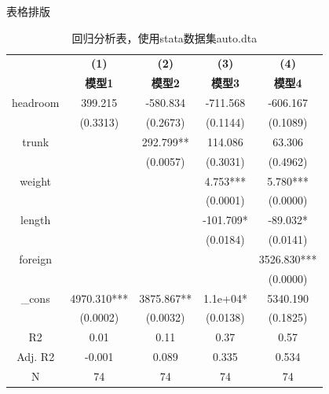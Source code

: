 \documentclass[xcolor=table,mathserif]{beamer}
\begin{document}
\begin{frame}{表格排版}
    \begin{table}[]
        \scriptsize
        \caption{回归分析表，使用stata数据集auto.dta}
        \begin{tabular}{ccccc}
        \hline
                 & \textbf{(1)} & \textbf{(2)} & \textbf{(3)} & \textbf{(4)} \\
                 & \textbf{模型1} & \textbf{模型2} & \textbf{模型3} & \textbf{模型4} \\ \hline
        headroom & 399.215      & -580.834     & -711.568     & -606.167     \\
                 & (0.3313)     & (0.2673)     & (0.1144)     & (0.1089)     \\
        trunk    &              & 292.799**    & 114.086      & 63.306       \\
                 &              & (0.0057)     & (0.3031)     & (0.4962)     \\
        weight   &              &              & 4.753***     & 5.780***     \\
                 &              &              & (0.0001)     & (0.0000)     \\
        length   &              &              & -101.709*    & -89.032*     \\
                 &              &              & (0.0184)     & (0.0141)     \\
        foreign  &              &              &              & 3526.830***  \\
                 &              &              &              & (0.0000)     \\
        \_cons   & 4970.310***  & 3875.867**   & 1.1e+04*     & 5340.190     \\
                 & (0.0002)     & (0.0032)     & (0.0138)     & (0.1825)     \\
        R2       & 0.01         & 0.11         & 0.37         & 0.57         \\
        Adj. R2  & -0.001       & 0.089        & 0.335        & 0.534        \\
        N        & 74           & 74           & 74           & 74           \\ \hline
        \end{tabular}\label{table}
    \end{table}
    
\end{frame}
\end{document}
